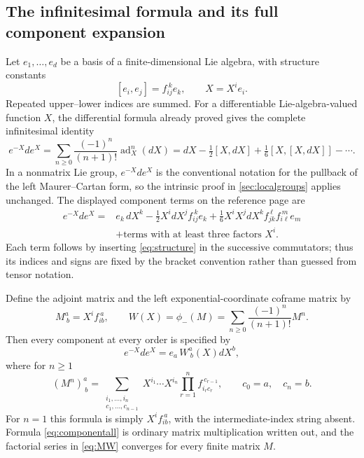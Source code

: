 \documentclass[11pt]{article}
\numberwithin{equation}{section}
\theoremstyle{definition}
\theoremstyle{remark}
\DeclareMathOperator{\ad}{ad}
\begin{document}
\subsection{The infinitesimal formula and its full component expansion}
Let $e_1,\ldots,e_d$ be a basis of a finite-dimensional Lie algebra,
with structure constants
\begin{equation}\label{eq:structure}
 [e_i,e_j]=f_{ij}^{\ k}e_k,\qquad X=X^i e_i.
\end{equation}
Repeated upper--lower indices are summed. For a differentiable
Lie-algebra-valued function $X$, the differential formula already
proved gives the complete infinitesimal identity
\begin{equation}\label{eq:infinitesimal}
 e^{-X}de^X=\sum_{n\geq0}\frac{(-1)^n}{(n+1)!}\ad_X^n(dX)
 =dX-\tfrac12[X,dX]+\tfrac16[X,[X,dX]]-\cdots.
\end{equation}
In a nonmatrix Lie group, $e^{-X}de^X$ is the conventional notation
for the pullback of the left Maurer--Cartan form, so the intrinsic
proof in \cref{sec:localgroups} applies unchanged.
The displayed component terms on the reference page are
\begin{equation}\label{eq:infinitesimalcomponents}
 \begin{aligned}
 e^{-X}de^X={}&e_k\,dX^k
 -\tfrac12 X^i dX^j f_{ij}^{\ k}e_k
 +\tfrac16X^iX^j dX^k f_{jk}^{\ \ell}f_{i\ell}^{\ m}e_m\\
 &+\text{terms with at least three factors }X^i.
 \end{aligned}
\end{equation}
Each term follows by inserting \eqref{eq:structure} in the
successive commutators; thus its indices and signs are fixed by the
bracket convention rather than guessed from tensor notation.

Define the adjoint matrix and the left exponential-coordinate
coframe matrix by
\begin{equation}\label{eq:MW}
 M^a_{\ b}=X^i f_{ib}^{\ a},\qquad
 W(X)=\phi_-(M)=\sum_{n\geq0}\frac{(-1)^n}{(n+1)!}M^n.
\end{equation}
Then every component at every order is specified by
\begin{equation}\label{eq:thetaW}
 e^{-X}de^X=e_a\,W^a_{\ b}(X)dX^b,
\end{equation}
where for $n\geq1$
\begin{equation}\label{eq:componentall}
 (M^n)^a_{\ b}
 =\sum_{\substack{i_1,\ldots,i_n\\c_1,\ldots,c_{n-1}}}
 X^{i_1}\cdots X^{i_n}
 \prod_{r=1}^n f_{i_r c_r}^{\ c_{r-1}},
 \qquad c_0=a,\quad c_n=b.
\end{equation}
For $n=1$ this formula is simply $X^if_{ib}^{\ a}$, with the
intermediate-index string absent. Formula \eqref{eq:componentall}
is ordinary matrix multiplication written out, and the factorial
series in \eqref{eq:MW} converges for every finite matrix $M$.
\end{document}
